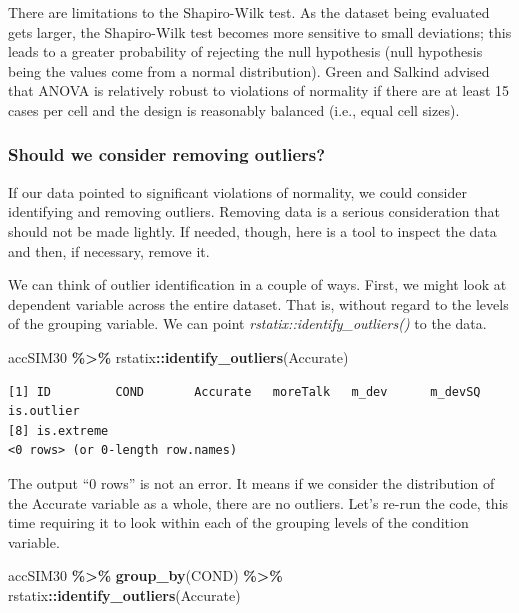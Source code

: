 \documentclass[
  11pt,
]{book}
\newenvironment{Shaded}{\begin{snugshade}}{\end{snugshade}}
\newcommand{\FunctionTok}[1]{\textcolor[rgb]{0.27,0.27,0.27}{\textbf{#1}}}
\newcommand{\NormalTok}[1]{#1}
\newcommand{\SpecialCharTok}[1]{\textcolor[rgb]{0.43,0.43,0.43}{\textbf{#1}}}
\begin{document}
There are limitations to the Shapiro-Wilk test. As the dataset being evaluated gets larger, the Shapiro-Wilk test becomes more sensitive to small deviations; this leads to a greater probability of rejecting the null hypothesis (null hypothesis being the values come from a normal distribution). Green and Salkind \citeyearpar{green_using_2017} advised that ANOVA is relatively robust to violations of normality if there are at least 15 cases per cell and the design is reasonably balanced (i.e., equal cell sizes).

\hypertarget{should-we-consider-removing-outliers}{%
\subsubsection{Should we consider removing outliers?}\label{should-we-consider-removing-outliers}}

If our data pointed to significant violations of normality, we could consider identifying and removing outliers. Removing data is a serious consideration that should not be made lightly. If needed, though, here is a tool to inspect the data and then, if necessary, remove it.

We can think of outlier identification in a couple of ways. First, we might look at dependent variable across the entire dataset. That is, without regard to the levels of the grouping variable. We can point \emph{rstatix::identify\_outliers()} to the data.

\begin{Shaded}
\begin{Highlighting}[]
\NormalTok{accSIM30 }\SpecialCharTok{\%\textgreater{}\%}
\NormalTok{    rstatix}\SpecialCharTok{::}\FunctionTok{identify\_outliers}\NormalTok{(Accurate)}
\end{Highlighting}
\end{Shaded}

\begin{verbatim}
[1] ID         COND       Accurate   moreTalk   m_dev      m_devSQ    is.outlier
[8] is.extreme
<0 rows> (or 0-length row.names)
\end{verbatim}

The output ``0 rows'' is not an error. It means if we consider the distribution of the Accurate variable as a whole, there are no outliers. Let's re-run the code, this time requiring it to look within each of the grouping levels of the condition variable.

\begin{Shaded}
\begin{Highlighting}[]
\NormalTok{accSIM30 }\SpecialCharTok{\%\textgreater{}\%}
    \FunctionTok{group\_by}\NormalTok{(COND) }\SpecialCharTok{\%\textgreater{}\%}
\NormalTok{    rstatix}\SpecialCharTok{::}\FunctionTok{identify\_outliers}\NormalTok{(Accurate)}
\end{Highlighting}
\end{Shaded}
\end{document}
